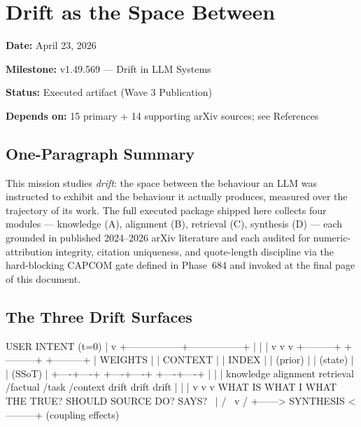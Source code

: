 \documentclass[11pt,letterpaper]{article}
\newcommand{\metafield}[2]{\textbf{\sffamily #1} #2\par}
\begin{document}
\section{Drift as the Space Between}
\label{sec:vision}

\metafield{Date:}{April 23, 2026}
\metafield{Milestone:}{v1.49.569 --- Drift in LLM Systems}
\metafield{Status:}{Executed artifact (Wave 3 Publication)}
\metafield{Depends on:}{15 primary + 14 supporting arXiv sources; see References}

\subsection{One-Paragraph Summary}
\label{sec:vision:summary}

This mission studies \emph{drift}: the space between the behaviour an LLM was
instructed to exhibit and the behaviour it actually produces, measured over the
trajectory of its work. The full executed package shipped here collects four
modules --- knowledge (A), alignment (B), retrieval (C), synthesis (D) --- each
grounded in published 2024--2026 arXiv literature and each audited for
numeric-attribution integrity, citation uniqueness, and quote-length discipline
via the hard-blocking CAPCOM gate defined in Phase~684 and invoked at the
final page of this document.

\subsection{The Three Drift Surfaces}
\label{sec:vision:surfaces}

\begin{asciibox}
                    USER INTENT (t=0)
                          |
                          v
        +-----------------+-----------------+
        |                 |                 |
        v                 v                 v
   +---------+       +---------+       +---------+
   | WEIGHTS |       | CONTEXT |       |  INDEX  |
   | (prior) |       | (state) |       |  (SSoT) |
   +----+----+       +----+----+       +----+----+
        |                 |                 |
   knowledge         alignment         retrieval
   /factual          /task             /context
    drift             drift             drift
        |                 |                 |
        v                 v                 v
     WHAT IS            WHAT I            WHAT THE
     TRUE?              SHOULD            SOURCE
                        DO?               SAYS?
         \               |                /
          \              v               /
           +------> SYNTHESIS <---------+
                  (coupling effects)
\end{asciibox}
\end{document}

